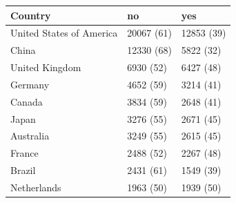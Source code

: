 \begin{table}[ht]
\centering
\begin{tabular}{lll}
 Country & no & yes \\ 
  \hline
United States of America & 20067 (61) & 12853 (39) \\ 
  China & 12330 (68) & 5822 (32) \\ 
  United Kingdom & 6930 (52) & 6427 (48) \\ 
  Germany & 4652 (59) & 3214 (41) \\ 
  Canada & 3834 (59) & 2648 (41) \\ 
  Japan & 3276 (55) & 2671 (45) \\ 
  Australia & 3249 (55) & 2615 (45) \\ 
  France & 2488 (52) & 2267 (48) \\ 
  Brazil & 2431 (61) & 1549 (39) \\ 
  Netherlands & 1963 (50) & 1939 (50) \\ 
  \end{tabular}
\end{table}
